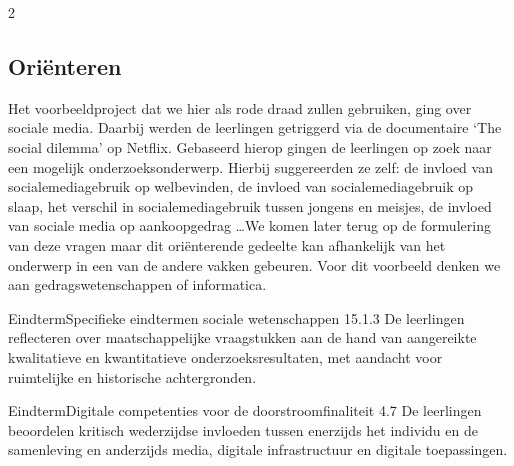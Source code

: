 \begin{multicols}{2}
\subsection*{Ori\"enteren}
Het voorbeeldproject dat we hier als rode draad zullen gebruiken, ging over sociale media. Daarbij werden de leerlingen getriggerd via de documentaire `The social dilemma' op Netflix. Gebaseerd hierop gingen de leerlingen op zoek naar een mogelijk onderzoeksonderwerp. Hierbij suggereerden ze zelf: de invloed van socialemediagebruik op welbevinden, de invloed van socialemediagebruik op slaap, het verschil in socialemediagebruik tussen jongens en meisjes, de invloed van sociale media op aankoopgedrag \ldots We komen later terug op de formulering van deze vragen maar dit ori\"enterende gedeelte kan afhankelijk van het onderwerp in een van de andere vakken gebeuren. Voor dit voorbeeld denken we aan gedragswetenschappen of informatica.

    \begin{kader}{Eindterm}{Specifieke eindtermen sociale wetenschappen}
             15.1.3 De leerlingen reflecteren over maatschappelijke vraagstukken aan de hand van aangereikte kwalitatieve en kwantitatieve onderzoeksresultaten, met aandacht voor ruimtelijke en historische achtergronden.
    \end{kader}
   \begin{kader}{Eindterm}{Digitale competenties voor de doorstroomfinaliteit}
             4.7 De leerlingen beoordelen kritisch wederzijdse invloeden tussen enerzijds het individu en de samenleving en anderzijds media, digitale infrastructuur en digitale toepassingen.
    \end{kader}  











    
	

\end{multicols}
